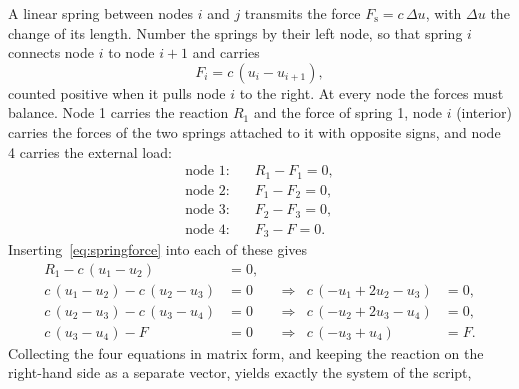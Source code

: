\documentclass[11pt,a4paper]{article}
\numberwithin{equation}{section}
\theoremstyle{remark}
\begin{document}
A linear spring between nodes $i$ and $j$ transmits the force $F_{\mathrm{s}} = c\,\Delta u$,
with $\Delta u$ the change of its length. Number the springs by their left node, so that
spring $i$ connects node $i$ to node $i+1$ and carries
\begin{equation}\label{eq:springforce}
  F_i = c\,(u_i - u_{i+1}),
\end{equation}
counted positive when it pulls node $i$ to the right. At every node the forces must
balance. Node 1 carries the reaction $R_1$ and the force of spring 1, node $i$ (interior)
carries the forces of the two springs attached to it with opposite signs, and node 4
carries the external load:
\begin{equation}\label{eq:nodalbalance}
  \begin{aligned}
    \text{node 1:}&\quad R_1 - F_1 = 0, \\
    \text{node 2:}&\quad F_1 - F_2 = 0, \\
    \text{node 3:}&\quad F_2 - F_3 = 0, \\
    \text{node 4:}&\quad F_3 - F = 0.
  \end{aligned}
\end{equation}
Inserting~\eqref{eq:springforce} into each of these gives
\begin{equation}\label{eq:nodalexpanded}
  \begin{aligned}
    R_1 - c\,(u_1 - u_2) &= 0, \\
    c\,(u_1 - u_2) - c\,(u_2 - u_3) &= 0 &&\Longrightarrow&  c\,(-u_1 + 2u_2 - u_3) &= 0,\\
    c\,(u_2 - u_3) - c\,(u_3 - u_4) &= 0 &&\Longrightarrow&  c\,(-u_2 + 2u_3 - u_4) &= 0,\\
    c\,(u_3 - u_4) - F &= 0 &&\Longrightarrow&  c\,(-u_3 + u_4) &= F.
  \end{aligned}
\end{equation}
Collecting the four equations in matrix form, and keeping the reaction on the right-hand
side as a separate vector, yields exactly the system of the script,
\end{document}

